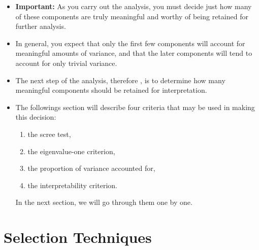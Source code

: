 \documentclass[a4paper,12pt]{article}
\begin{document}
\begin{itemize}
	\item 

\textbf{Important:} As you carry out the analysis, you must decide just how many of these components are truly
meaningful and worthy of being retained for further analysis.


\item In general, you expect
that only the first few components will account for meaningful amounts of variance, and that the
later components will tend to account for only trivial variance.


\item The next step of the analysis, therefore , is to determine how many meaningful components should be retained for
interpretation.  


\item The followings section will describe four criteria that may be used in making this decision:
\begin{enumerate} 
	\item the scree test,
	\item the eigenvalue-one criterion,  
	\item the proportion of variance accounted for, 
	\item the interpretability criterion.
\end{enumerate}
In the next section, we will go through them one by one.
\end{itemize}

\section{Selection Techniques}
\end{document}
